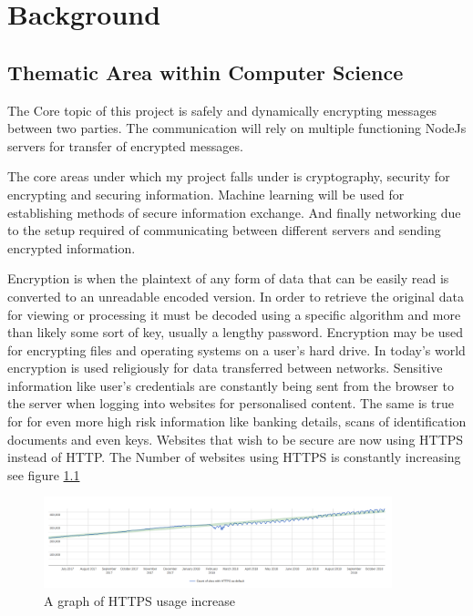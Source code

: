 \chapter{Background}
\label{chap:background}
%
%
%
%

%
%
%
%
\section{Thematic Area within Computer Science}
The Core topic of this project is safely and dynamically encrypting messages between two parties. The communication will rely on multiple functioning NodeJs servers for transfer of encrypted messages. 

The core areas under which my project falls under is cryptography, security for encrypting and securing information. Machine learning will be used for establishing methods of secure information exchange. And finally networking due to the setup required of communicating between different servers and sending encrypted information.


Encryption \cite{encryptionDefinition} is when the plaintext of any form of data that can be easily read is converted to an unreadable encoded version. In order to retrieve the original data for viewing or processing it must be decoded using a specific algorithm and more than likely some sort of key, usually a lengthy password. Encryption may be used for encrypting files and operating systems on a user's hard drive. In today's world encryption is used religiously for data transferred between networks. Sensitive information like user's credentials are constantly being sent from the browser to the server when logging into websites for personalised content. The same is true for for even more high risk information like banking details, scans of identification documents and even keys. Websites that wish to be secure are now using HTTPS instead of HTTP. The Number of websites using HTTPS is constantly increasing see figure \ref{fig:httpsRise}

\begin{figure}[ht]
  \centering
      \includegraphics[width=0.9\textwidth]{Figures/httpsRise.png}
  \caption[A graph of HTTPS usage increase]{A graph of HTTPS usage increase\cite{https}}
  \label{fig:httpsRise}
\end{figure}


